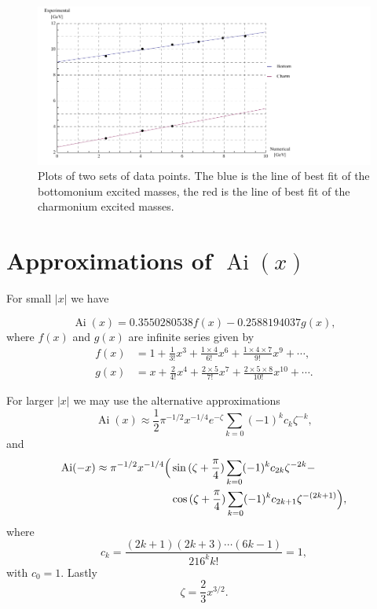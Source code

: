 \documentclass[]{article}
\renewcommand{\mod}[1]{\ensuremath{\lvert {#1} \rvert}}
\newcommand{\Ai}[1]{\ensuremath{\operatorname{Ai}({#1})}}
\begin{document}
\begin{figure}[H]
	\hspace*{-0.15\textwidth}
	\centering
	\includegraphics[scale=1.3]{experimental-numerical}
	\caption{Plots of two sets of data points. The blue is the line of best fit of the bottomonium excited masses, the red is the line of best fit of the charmonium excited masses.}
	\label{fig:data}
\end{figure}


\appendix
\section{Approximations of \Ai{x}}\label{app:approximations}

For small $\mod{x}$ we have

\[\Ai{x} = 0.3550280538f(x) - 0.2588194037g(x),\]
where $f(x)$ and $g(x)$ are infinite series given by
\begin{align}
f(x) &= 1 + \frac{1}{3!}x^{3} + \frac{1\times4}{6!}x^{6} + \frac{1\times4\times{7}}{9!}x^{9} + \dotsb,\label{eqn:airyfirstf}\\
g(x) &= x + \frac{2}{4!}x^{4} + \frac{2\times5}{7!}x^{7} + \frac{2\times5\times{8}}{10!}x^{10} + \dotsb\label{eqn:airyfirstg}.
\end{align}

For larger $\mod{x}$ we may use the alternative approximations
\[
\Ai{x} \approx \frac{1}{2}\pi^{-1/2}x^{-1/4}e^{-\zeta} \sum\limits_{k=0} (-1)^{k}c_{k}\zeta^{-k},
\]
and
\[
	\begin{split}
		\Ai{-x} \approx \pi^{-1/2}x^{-1/4}
		\Bigl(
			&\sin{(\zeta + \frac{\pi}{4})}\sum\limits_{k=0}(-1)^{k}c_{2k}\zeta^{-2k} -\\
			&\cos{(\zeta + \frac{\pi}{4})}\sum\limits_{k=0}(-1)^{k}c_{2k+1}\zeta^{-(2k+1)}
		\Bigr),
	\end{split}
\]
where
\begin{equation}\label{eqn:ck}
c_{k} = \frac{(2k+1)(2k+3)\dotsb(6k-1)}{216^{k}k!} = 1,
\end{equation}
with $c_{0} = 1$. Lastly
\[
\zeta = \frac{2}{3}x^{3/2}.
\]
\end{document}
